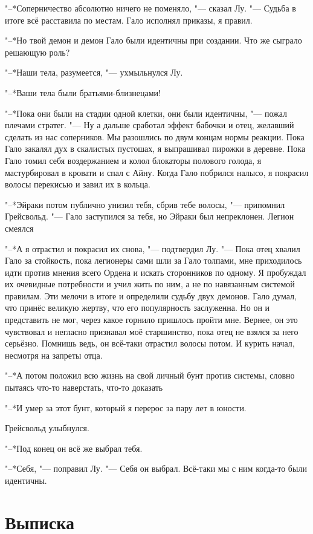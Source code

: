 \documentclass[a4paper,10pt]{book}
\newcommand{\ldotst}{\so{...}\xspace}
\begin{document}
"--*Соперничество абсолютно ничего не поменяло, "--- сказал Лу. "--- Судьба в итоге всё расставила по местам. Гало исполнял приказы, я правил.

"--*Но твой демон и демон Гало были идентичны при создании. Что же сыграло решающую роль?

"--*Наши тела, разумеется, "--- ухмыльнулся Лу.

"--*Ваши тела были братьями-близнецами!

"--*Пока они были на стадии одной клетки, они были идентичны, "--- пожал плечами стратег. "--- Ну а дальше сработал эффект бабочки и отец, желавший сделать из нас соперников. Мы разошлись по двум концам нормы реакции. Пока Гало закалял дух в скалистых пустошах, я выпрашивал пирожки в деревне. Пока Гало томил себя воздержанием и колол блокаторы полового голода, я мастурбировал в кровати и спал с Айну. Когда Гало побрился налысо, я покрасил волосы перекисью и завил их в кольца.

"--*Эйраки потом публично унизил тебя, сбрив тебе волосы, "--- припомнил Грейсвольд. "--- Гало заступился за тебя, но Эйраки был непреклонен. Легион смеялся\ldotst

"--*А я отрастил и покрасил их снова, "--- подтвердил Лу. "--- Пока отец хвалил Гало за стойкость, пока легионеры сами шли за Гало толпами, мне приходилось идти против мнения всего Ордена и искать сторонников по одному. Я пробуждал их очевидные потребности и учил жить по ним, а не по навязанным системой правилам. Эти мелочи в итоге и определили судьбу двух демонов. Гало думал, что принёс великую жертву, что его популярность заслуженна. Но он и представить не мог, через какое горнило пришлось пройти мне. Вернее, он это чувствовал и негласно признавал моё старшинство, пока отец не взялся за него серьёзно. Помнишь ведь, он всё-таки отрастил волосы потом. И курить начал, несмотря на запреты отца.

"--*А потом положил всю жизнь на свой личный бунт против системы, словно пытаясь что-то наверстать, что-то доказать\ldotst

"--*И умер за этот бунт, который я перерос за пару лет в юности.

Грейсвольд улыбнулся.

"--*Под конец он всё же выбрал тебя.

"--*Себя, "--- поправил Лу. "--- Себя он выбрал. Всё-таки мы с ним когда-то были идентичны.

\section{Выписка}
\end{document}
